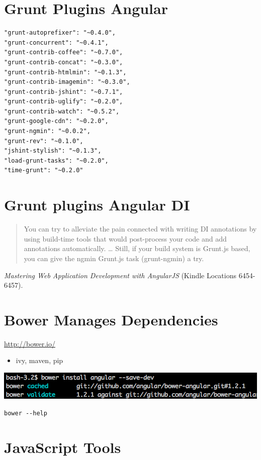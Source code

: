 \documentclass[11pt]{article}
\begin{document}
\section*{Grunt Plugins Angular}
\label{sec-19}

\begin{verbatim}
"grunt-autoprefixer": "~0.4.0",
"grunt-concurrent": "~0.4.1",
"grunt-contrib-coffee": "~0.7.0",
"grunt-contrib-concat": "~0.3.0",
"grunt-contrib-htmlmin": "~0.1.3",
"grunt-contrib-imagemin": "~0.3.0",
"grunt-contrib-jshint": "~0.7.1",
"grunt-contrib-uglify": "~0.2.0",
"grunt-contrib-watch": "~0.5.2",
"grunt-google-cdn": "~0.2.0",
"grunt-ngmin": "~0.0.2",
"grunt-rev": "~0.1.0",
"jshint-stylish": "~0.1.3",
"load-grunt-tasks": "~0.2.0",
"time-grunt": "~0.2.0"
\end{verbatim}

\section*{Grunt plugins Angular DI}
\label{sec-20}

\begin{quote}
You can try to alleviate the pain connected with writing DI
annotations by using build-time tools that would post-process your
code and add annotations automatically. 
\ldots{}
Still, if your build system is Grunt.js based, you can give the
ngmin Grunt.js task (grunt-ngmin)
a try.
\end{quote}

\emph{Mastering Web Application Development with AngularJS} (Kindle Locations 6454-6457).
\section*{Bower Manages Dependencies}
\label{sec-21}

\url{http://bower.io/}

\begin{itemize}
\item ivy, maven, pip
\end{itemize}

\includegraphics[width=.9\linewidth]{gdg_2013-11-18_yo_grunt_bower/eg-bower.png}

\begin{verbatim}
bower --help
\end{verbatim}
\section*{JavaScript Tools}
\label{sec-22}
\end{document}
